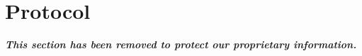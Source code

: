 \section{Protocol}\label{proto}
\begin{center}
    \textit{\textbf{This section has been removed to protect our proprietary information.}}
\end{center}
